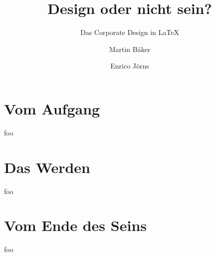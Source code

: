\documentclass{beamer}
\begin{document}
\title{Design oder nicht sein?}
\subtitle{Das Corporate Design in  LaTeX}
\author{Martin Bäker\and Enrico Jörns}

\begin{frame}[plain]
  \titlepage
\end{frame}


\part{Vom Aufgang}

\begin{frame}[plain]
  \partpage
\end{frame}

\begin{frame}
  foo
\end{frame}

\part{Das Werden}

\begin{frame}
  \partpage
\end{frame}


\begin{frame}
  foo
\end{frame}

\part{Vom Ende des Seins}



\begin{frame}
  foo
\end{frame}



\begin{frame}[plain]
  \partpage
\end{frame}
\end{document}
